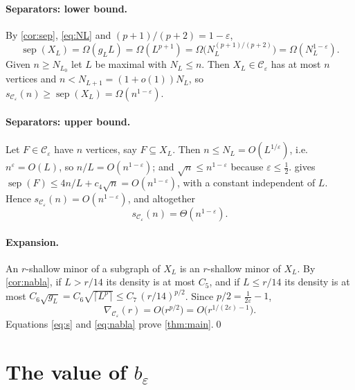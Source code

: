 \documentclass[11pt,a4paper]{article}
\theoremstyle{plain}
\theoremstyle{definition}
\theoremstyle{remark}
\newcommand{\sep}{\operatorname{sep}}
\newcommand{\cC}{\mathcal C}
\begin{document}
\paragraph{Separators: lower bound.}
By \cref{cor:sep}, \eqref{eq:NL} and $(p+1)/(p+2)=1-\varepsilon$,
\begin{equation}\label{eq:sepXL}
 \sep(X_L)=\Omega(g_LL)=\Omega(L^{p+1})=\Omega\bigl(N_L^{(p+1)/(p+2)}\bigr)=\Omega(N_L^{1-\varepsilon}).
\end{equation}
Given $n\ge N_{L_0}$ let $L$ be maximal with $N_L\le n$. Then $X_L\in\cC_\varepsilon$ has at most $n$ vertices and $n<N_{L+1}=(1+o(1))N_L$, so $s_{\cC_\varepsilon}(n)\ge\sep(X_L)=\Omega(n^{1-\varepsilon})$.

\paragraph{Separators: upper bound.}
Let $F\in\cC_\varepsilon$ have $n$ vertices, say $F\subseteq X_L$. Then $n\le N_L=O(L^{1/\varepsilon})$, i.e.\ $n^{\varepsilon}=O(L)$, so $n/L=O(n^{1-\varepsilon})$; and $\sqrt n\le n^{1-\varepsilon}$ because $\varepsilon\le\frac12$.  gives $\sep(F)\le 4n/L+c_4\sqrt n=O(n^{1-\varepsilon})$, with a constant independent of $L$. Hence $s_{\cC_\varepsilon}(n)=O(n^{1-\varepsilon})$, and altogether
\begin{equation}\label{eq:s}
 s_{\cC_\varepsilon}(n)=\Theta(n^{1-\varepsilon}).
\end{equation}

\paragraph{Expansion.}
An $r$-shallow minor of a subgraph of $X_L$ is an $r$-shallow minor of $X_L$. By \cref{cor:nabla}, if $L>r/14$ its density is at most $C_5$, and if $L\le r/14$ its density is at most $C_6\sqrt{g_L}=C_6\sqrt{\lceil L^p\rceil}\le C_7\,(r/14)^{p/2}$. Since $p/2=\frac1{2\varepsilon}-1$,
\begin{equation}\label{eq:nabla}
 \nabla_{\cC_\varepsilon}(r)=O\bigl(r^{p/2}\bigr)=O\bigl(r^{1/(2\varepsilon)-1}\bigr).
\end{equation}
Equations \eqref{eq:s} and \eqref{eq:nabla} prove \cref{thm:main}.\qed

\section{The value of \texorpdfstring{$b_\varepsilon$}{b\_eps}}\label{sec:beps}
\end{document}
